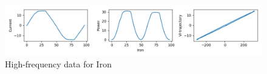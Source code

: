 \begin{figure} 
	\centering
	\includegraphics[width=1\linewidth]{images/iron40A2}
	\caption[High-frequency data for Iron]{High-frequency data for Iron}
	\label{fig:iron40A2}
\end{figure}
